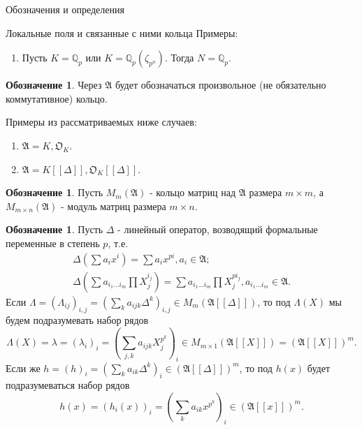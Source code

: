 \documentclass[a4paper,14pt]{extarticle}
\theoremstyle{definition}
\newtheorem{denotation}[definition]{Обозначение}
\newcommand{\bQ}{\mathbb{Q}}
\newcommand{\fA}{\mathfrak{A}}
\newcommand{\fO}{\mathfrak{O}}
\begin{document}
\begin{section}{Обозначения и определения}
\begin{subsection}{Локальные поля и связанные с ними кольца}
Примеры:
\begin{enumerate}
    \item Пусть ${ K = \bQ_p }$ или ${ K = \bQ_p(\zeta_{p^n}) }$. Тогда ${ N = \bQ_p }$.
\end{enumerate}

\begin{denotation}\label{denote:1.0:fA}
    Через $\fA$ будет обозначаться произвольное (не обязательно коммутативное) кольцо.
\end{denotation}

Примеры из рассматриваемых ниже случаев:
\begin{enumerate}
    \item ${ \fA = K, \fO_K }$.
    \item ${ \fA = K[[\Delta]], \fO_K[[\Delta]] }$.
\end{enumerate}

\begin{denotation}\label{denote:1.1:matrix_ring}
    Пусть $M_m(\fA)$ - кольцо матриц над $\fA$ размера ${ m \times m }$, а $M_{m \times n}(\fA)$ - модуль матриц размера ${ m \times n }$.
\end{denotation}

\begin{denotation}\label{denote:1.2:Delta}
    Пусть $\Delta$ - линейный оператор, возводящий формальные переменные в степень $p$, т.е.
    \begin{gather*}
        \Delta\left(\sum a_i x^i\right) =
        \sum a_i x^{pi},
        a_i \in \fA; \\
        \Delta\left(
            \sum a_{i_1 ... i_m} \prod X_j^{i_j}
        \right) =
        \sum a_{i_1 ... i_m} \prod X_j^{p i_j},
        a_{i_1 ... i_m} \in \fA.
    \end{gather*}
    Если ${ \Lambda = (\Lambda_{i j})_{i, j} = \left( \sum\limits_k a_{i j k} \Delta^k \right)_{i, j} \in M_m(\fA[[\Delta]]) }$, то под $\Lambda(X)$ мы будем подразумевать набор рядов
    \begin{equation*}
        \Lambda(X) =
        \lambda =
        (\lambda_i)_i =
        \left(
            \sum_{j, k} a_{i j k} X_j^{p^k}
        \right)_i \in
        M_{m \times 1}(\fA[[X]]) =
        (\fA[[X]])^m.
    \end{equation*}
    Если же ${ h = (h)_i = \left( \sum\limits_k a_{i k} \Delta^k \right)_i \in (\fA[[\Delta]])^m }$, то под $h(x)$ будет подразумеваться набор рядов
    \begin{equation*}
        h(x) =
        (h_i(x))_i =
        \left(
            \sum_k a_{i k} x^{p^k}
        \right)_i \in
        (\fA[[x]])^m.
    \end{equation*}
\end{denotation}


\end{subsection}
\end{section}
\end{document}
